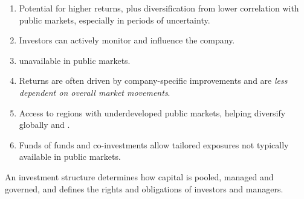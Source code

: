 \begin{imkeybox}[title={Six motivations}]
\begin{enumerate}
\item {} Potential for higher returns, plus
diversification from lower correlation with public markets, especially in periods
of uncertainty.
\item {} Investors can actively monitor and
influence the company.
\item {} unavailable in public markets.
\item {} Returns are often driven by
company-specific improvements and are \emph{less dependent on overall market
movements}.
\item {} Access to regions with underdeveloped public
markets, helping diversify globally and .
\item {} Funds of funds and co-investments
allow tailored exposures not typically available in public markets.
\end{enumerate}
\end{imkeybox}


An investment structure determines how capital is pooled, managed and governed,
and defines the rights and obligations of investors and managers.


